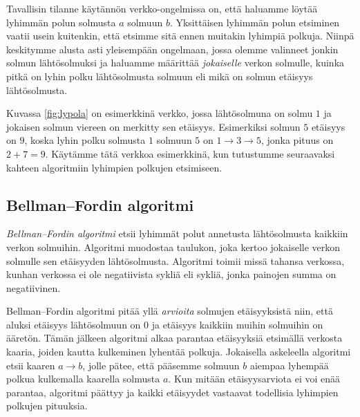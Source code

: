 Tavallisin tilanne käytännön verkko-ongelmissa on,
että haluamme löytää lyhimmän polun solmusta $a$ solmuun $b$.
Yksittäisen lyhimmän polun etsiminen vaatii usein kuitenkin,
että etsimme sitä ennen muitakin lyhimpiä polkuja.
Niinpä keskitymme alusta asti yleisempään ongelmaan,
jossa olemme valinneet jonkin solmun lähtösolmuksi
ja haluamme määrittää \emph{jokaiselle} verkon solmulle,
kuinka pitkä on lyhin polku lähtösol\-musta solmuun
eli mikä on solmun etäisyys lähtösolmusta.

Kuvassa \ref{fig:lypola} on esimerkkinä verkko,
jossa lähtösolmuna on solmu $1$ ja jokaisen solmun
viereen on merkitty sen etäisyys.
Esimerkiksi solmun $5$ etäisyys on $9$,
koska lyhin polku solmusta $1$ solmuun $5$ on
$1 \rightarrow 3 \rightarrow 5$, jonka pituus on $2+7=9$.
Käytämme tätä verkkoa esimerkkinä, kun tutustumme
seuraavaksi kahteen algoritmiin lyhimpien polkujen etsimiseen.

\subsection{Bellman–Fordin algoritmi}


\emph{Bellman–Fordin algoritmi} etsii lyhimmät polut
annetusta lähtösolmusta kaikkiin verkon solmuihin.
Algoritmi muodostaa taulukon, joka kertoo jokaiselle
verkon solmulle sen etäisyyden lähtösolmusta.
Algoritmi toimii missä tahansa verkossa,
kunhan verkossa ei ole negatiivista sykliä eli sykliä,
jonka painojen summa on negatiivinen.

Bellman–Fordin algoritmi pitää yllä \emph{arvioita}
solmujen etäisyyksistä niin,
että aluksi etäisyys lähtösolmuun on 0 ja etäisyys
kaikkiin muihin solmuihin on ääretön.
Tämän jälkeen algoritmi alkaa parantaa etäisyyksiä
etsimällä verkosta kaaria, joiden kautta kulkeminen
lyhentää polkuja.
Jokaisella askeleella algoritmi etsii kaaren $a \rightarrow b$,
jolle pätee, että pääsemme solmuun $b$ aiempaa lyhempää polkua
kulkemalla kaarella solmusta $a$.
Kun mitään etäisyysarviota ei voi enää parantaa,
algoritmi päättyy ja kaikki etäisyydet vastaavat
todellisia lyhimpien polkujen pituuksia.

